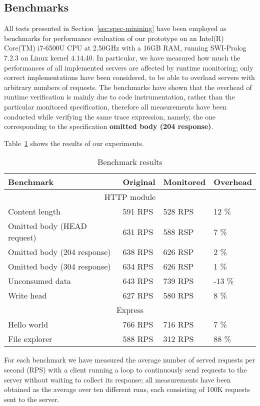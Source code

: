 \subsection{Benchmarks}

All tests presented in Section~\ref{sec:spec-minining} have been employed as benchmarks for performance evaluation
of our prototype on an Intel(R) Core(TM) i7-6500U CPU at 2.50GHz with a 16GB RAM, running SWI-Prolog 7.2.3 on
Linux kernel 4.14.40.
In particular, we have measured how much the performances of all implemented servers are affected by runtime monitoring;
only correct implementations have been considered, to be able to overload servers with arbitrary numbers of requests.
The benchmarks have shown that the overhead of runtime verification is mainly due to code instrumentation, rather than the particular monitored
specification, therefore all measurements have been conducted while verifying the same trace expression, namely, 
the one corresponding to the specification \textbf{omitted body (204 response)}.

Table~\ref{table} shows the results of our experiments. 
\begin{table}[ht]
  \begin{tabular}{|l|l|l|l|}
    \hline
    \textbf{Benchmark} & 
    \textbf{Original} &
    \textbf{Monitored} &
    \textbf{Overhead} \\
    \hline
    \multicolumn{4}{|c|}{HTTP module}\\
    \hline
    Content length & 
    591 RPS &
    528 RPS &
    12 \% \\

    Omitted body (HEAD request)&
    631 RPS &
    588 RSP &
    7 \% \\

    Omitted body (204 response)&
    638 RPS &
    626 RSP &
    2 \% \\

    Omitted body (304 response)&
    634 RPS &
    626 RSP &
    1 \% \\

    Unconsumed data &
    643 RPS &
    739 RPS &
    -13 \% \\

    Write head &
    627 RPS &
    580 RPS &
    8 \% \\
    \hline

    \multicolumn{4}{|c|}{Express}\\
    \hline
    Hello world & 
    766 RPS &
    716 RPS &
    7 \% \\

    File explorer &
    588 RPS &
    312 RPS &
    88 \%\\

    \hline
  \end{tabular}
  \caption{Benchmark results}
  \label{table}
\end{table}
For each benchmark we have measured the average number of served requests per second (RPS) 
with a client running a loop to continuously send requests to the server without waiting to collect its response;
all measurements have been obtained as the average over ten different runs, each consisting
of 100K requests sent to the server.

